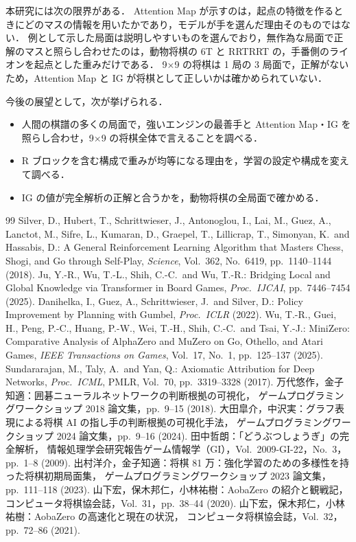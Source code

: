 \documentclass[submit]{ipsj}
\begin{document}
本研究には次の限界がある．
Attention Map が示すのは，起点の特徴を作るときにどのマスの情報を用いたかであり，モデルが手を選んだ理由そのものではない．
例として示した局面は説明しやすいものを選んでおり，無作為な局面で正解のマスと照らし合わせたのは，動物将棋の 6T と RRTRRT の，手番側のライオンを起点とした重みだけである．
9×9 の将棋は 1 局の 3 局面で，正解がないため，Attention Map と IG が将棋として正しいかは確かめられていない．

今後の展望として，次が挙げられる．
\begin{itemize}
  \item 人間の棋譜の多くの局面で，強いエンジンの最善手と Attention Map・IG を照らし合わせ，9×9 の将棋全体で言えることを調べる．
  \item R ブロックを含む構成で重みが均等になる理由を，学習の設定や構成を変えて調べる．
  \item IG の値が完全解析の正解と合うかを，動物将棋の全局面で確かめる．
\end{itemize}

\begin{thebibliography}{99}
 Silver, D., Hubert, T., Schrittwieser, J., Antonoglou, I., Lai, M., Guez, A., Lanctot, M., Sifre, L.,
  Kumaran, D., Graepel, T., Lillicrap, T., Simonyan, K.\ and Hassabis, D.: A General Reinforcement Learning Algorithm that
  Masters Chess, Shogi, and Go through Self-Play, \textit{Science}, Vol.~362, No.~6419, pp.~1140--1144 (2018).
 Ju, Y.-R., Wu, T.-L., Shih, C.-C.\ and Wu, T.-R.: Bridging Local and
  Global Knowledge via Transformer in Board Games, \textit{Proc.\ IJCAI}, pp.~7446--7454 (2025).
 Danihelka, I., Guez, A., Schrittwieser, J.\ and Silver, D.: Policy
  Improvement by Planning with Gumbel, \textit{Proc.\ ICLR} (2022).
 Wu, T.-R., Guei, H., Peng, P.-C., Huang, P.-W., Wei, T.-H., Shih, C.-C.\ and Tsai, Y.-J.:
  MiniZero: Comparative Analysis of AlphaZero and MuZero on Go, Othello, and Atari Games,
  \textit{IEEE Transactions on Games}, Vol.~17, No.~1, pp.~125--137 (2025).
 Sundararajan, M., Taly, A.\ and Yan, Q.: Axiomatic Attribution for Deep Networks,
  \textit{Proc.\ ICML}, PMLR, Vol.~70, pp.~3319--3328 (2017).
 万代悠作，金子知適：囲碁ニューラルネットワークの判断根拠の可視化，
  ゲームプログラミングワークショップ 2018 論文集，pp.~9--15 (2018).
 大田皐介，中沢実：グラフ表現による将棋 AI の指し手の判断根拠の可視化手法，
  ゲームプログラミングワークショップ 2024 論文集，pp.~9--16 (2024).
 田中哲朗：「どうぶつしょうぎ」の完全解析，
  情報処理学会研究報告ゲーム情報学（GI），Vol.~2009-GI-22，No.~3，pp.~1--8 (2009).
 出村洋介，金子知適：将棋 81 万：強化学習のための多様性を持った将棋初期局面集，
  ゲームプログラミングワークショップ 2023 論文集，pp.~111--118 (2023).
 山下宏，保木邦仁，小林祐樹：AobaZero の紹介と観戦記，
  コンピュータ将棋協会誌，Vol.~31，pp.~38--44 (2020).
 山下宏，保木邦仁，小林祐樹：AobaZero の高速化と現在の状況，
  コンピュータ将棋協会誌，Vol.~32，pp.~72--86 (2021).
\end{thebibliography}
\end{document}
